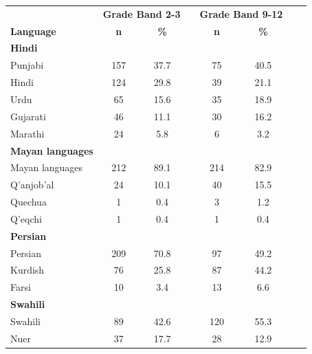 \documentclass [PhD] {uclathes}
\begin{document}
\begin{table}[htbp]
\centering
\begin{tabular}{lccccccc}
\toprule
    & \multicolumn{2}{c}{\textbf{Grade Band 2-3}} & \multicolumn{1}{c}{ } & \multicolumn{2}{c}{\textbf{Grade Band 9-12}} \\
    \cline{2-3}
    \cline{5-6}
     \textbf{Language} & \textbf{n} & \textbf{\%} & & \textbf{n} & \textbf{\%} \\
    \midrule
\textbf{Hindi} & & & & & \\
\hspace{3mm} Punjabi & 157 & 37.7 & & 75 & 40.5 \\
\hspace{3mm} Hindi & 124 & 29.8 & & 39 & 21.1 \\
\hspace{3mm} Urdu & 65 & 15.6 & & 35 & 18.9 \\
\hspace{3mm} Gujarati & 46 & 11.1 & & 30 & 16.2 \\
\hspace{3mm} Marathi & 24 & 5.8 & & 6 & 3.2 \\
\textbf{Mayan languages} & & & & & \\
\hspace{3mm} Mayan languages & 212 & 89.1 & & 214 & 82.9 \\
\hspace{3mm} Q'anjob'al & 24 & 10.1 & & 40 & 15.5 \\
\hspace{3mm} Quechua & 1 & 0.4 & & 3 & 1.2 \\
\hspace{3mm} Q'eqchi & 1 & 0.4 & & 1 & 0.4 \\
\textbf{Persian} & & & & & \\
\hspace{3mm} Persian & 209 & 70.8 & & 97 & 49.2 \\
\hspace{3mm} Kurdish & 76 & 25.8 & & 87 & 44.2 \\
\hspace{3mm} Farsi & 10 & 3.4 & & 13 & 6.6 \\
\textbf{Swahili} & & & & & \\
\hspace{3mm} Swahili & 89 & 42.6 & & 120 & 55.3 \\
\hspace{3mm} Nuer & 37 & 17.7 & & 28 & 12.9 \\

\end{tabular}
\end{table}
\end{document}
